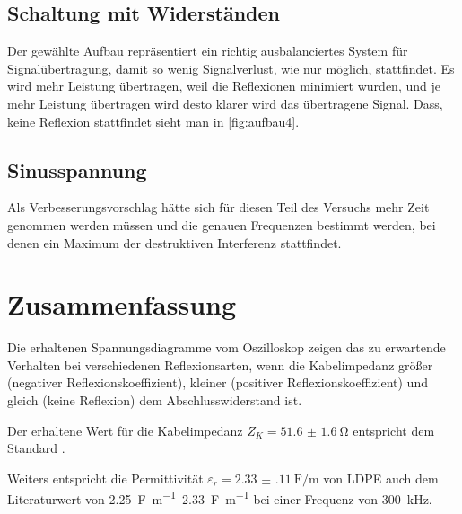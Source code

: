 \documentclass[11pt,ngerman]{scrartcl}
\begin{document}
\subsection{Schaltung mit Widerständen}

Der gewählte Aufbau repräsentiert ein richtig ausbalanciertes System
für Signalübertragung, damit so wenig Signalverlust, wie nur möglich,
stattfindet. Es wird mehr Leistung übertragen, weil die Reflexionen minimiert
wurden, und je mehr Leistung übertragen wird desto klarer wird das übertragene
Signal. Dass, keine Reflexion stattfindet sieht man in \autoref{fig:aufbau4}.

\subsection{Sinusspannung}

Als Verbesserungsvorschlag hätte sich für diesen Teil des Versuchs mehr Zeit
genommen werden müssen und die genauen Frequenzen bestimmt werden, bei denen
ein Maximum der destruktiven Interferenz stattfindet.

\section{Zusammenfassung}

Die erhaltenen Spannungsdiagramme vom Oszilloskop zeigen das zu erwartende
Verhalten bei verschiedenen Reflexionsarten, wenn die Kabelimpedanz größer
(negativer Reflexionskoeffizient), kleiner (positiver Reflexionskoeffizient)
und gleich (keine Reflexion) dem Abschlusswiderstand  ist.

\noindent Der erhaltene Wert für die Kabelimpedanz $Z_K = \SI{51.6(16)}{\ohm}$ entspricht
dem Standard \cite{standardkoaxial}.

\noindent Weiters entspricht die Permittivität $\varepsilon_r =
	\SI{2.33(11)}{\farad\per\meter}$ von LDPE auch dem Literaturwert von
\SIrange{2.25}{2.33}{\farad\per\meter} \cite{permittivity} bei einer Frequenz
von \SI{300}{\kHz}.

\newpage

\printbibliography
\listoffigures
\listoftables
\end{document}

